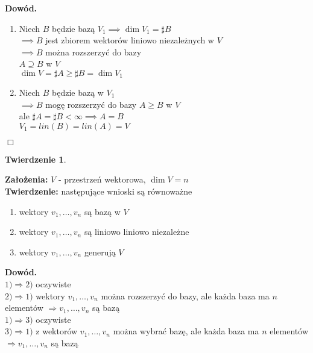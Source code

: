 \documentclass[a5paper,8pt]{article}
\newtheorem{theorem}{Twierdzenie}[section]
\begin{document}
    \large{\textbf{Dowód.}} \\
    \begin{enumerate}
        \item Niech $B$ będzie bazą $ V_1 \implies \dim V_1 = \sharp B $ \\
              $ \implies B $ jest zbiorem wektorów liniowo niezależnych w $ V $ \\
              $ \implies B $ można rozszerzyć do bazy \\
              $ A \supseteq B $ w $ V $ \\
              $ \dim V = \sharp A \geq \sharp B = \dim V_1 $
        \item Niech $B$ będzie bazą w $V_1$ \\
              $ \implies B $ mogę rozszerzyć do bazy $ A \geq B $ w $V$ \\
              ale  $ \sharp A = \sharp B < \infty \implies A = B $ \\

              $ V_1 = lin( B ) = lin( A ) = V  $
    \end{enumerate}

    \begin{flushright}
        $ \Box $
    \end{flushright}

    \begin{theorem}
    \end{theorem}
    \textbf{Założenia:} $ V $ - przestrzeń wektorowa, $ \dim V = n $ \\
    \textbf{Twierdzenie:} następujące wnioski są równoważne

    \begin{enumerate}
        \item
            wektory $ v_1, \dots, v_n $ są bazą w $ V $
        \item
            wektory $ v_1, \dots, v_n $ są liniowo liniowo niezależne
        \item
            wektory $ v_1, \dots, v_n $ generują $ V $
    \end{enumerate}

    \large{\textbf{Dowód.}} \\
    $ 1) \Longrightarrow 2) $ oczywiste \\
    $ 2) \Longrightarrow 1) $ wektory $ v_1, \dots, v_n $ można rozszerzyć
    do bazy, ale każda baza ma $n$ elementów $ \Longrightarrow v_1, \dots, v_n $ są bazą \\
    $ 1) \Longrightarrow 3) $ oczywiste \\
    $ 3) \Longrightarrow 1) $ z wektorów  $ v_1, \dots, v_n $ można wybrać bazę, ale
    każda baza ma $n$ elementów $ \Longrightarrow v_1, \dots, v_n $ są bazą \\
\end{document}
